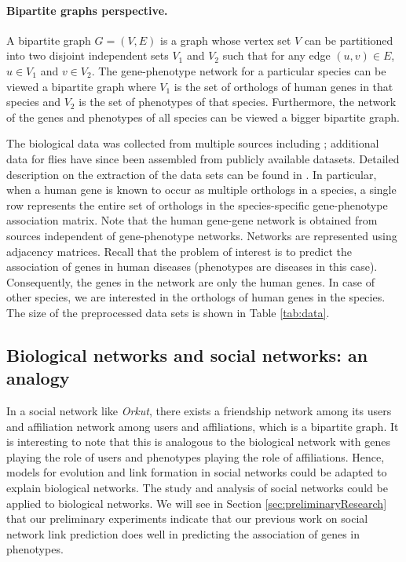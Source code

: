 \paragraph{Bipartite graphs perspective.}
A bipartite graph $G = (V, E)$ is a graph whose vertex set $V$ can be partitioned into two disjoint independent sets $V_{1}$ and $V_{2}$ such that for any edge $(u, v) \in E$, $u \in V_{1}$ and $v \in V_{2}$. The gene-phenotype network for a particular species can be viewed a bipartite graph where $V_{1}$ is the set of orthologs of human genes in that species and $V_{2}$ is the set of phenotypes of that species\cite{pmid19010805, pmid20215462}. Furthermore, the network of the genes and phenotypes of all species can be viewed a bigger bipartite graph. 

The biological data was collected from multiple sources including \cite{pmid18223650, pmid17912365, pmid18613949, pmid20118918}; additional data for flies have since been assembled from publicly available datasets. Detailed description on the extraction of the data sets can be found in \cite{McGarySI}. In particular, when a human gene is known to occur as multiple orthologs in a species, a single row represents the entire set of orthologs in the species-specific gene-phenotype association matrix. Note that the human gene-gene network is obtained from sources independent of gene-phenotype networks\cite{pmid19767740, pmid19728866, pmid19246570}. Networks are represented using adjacency matrices. Recall that the problem of interest is to predict the association of genes in human diseases (phenotypes are diseases in this case). Consequently, the genes in the network are only the human genes. In case of other species, we are interested in the orthologs of human genes in the species. The size of the preprocessed data sets is shown in Table \ref{tab:data}.

\subsection{Biological networks and social networks: an analogy}
In a social network like \emph{Orkut}, there exists a friendship network among its users and affiliation network among users and affiliations, which is a bipartite graph. It is interesting to note that this is analogous to the biological network with genes playing the role of users and phenotypes playing the role of affiliations. Hence, models for evolution and link formation in social networks could be adapted to explain biological networks. The study and analysis of social networks could be applied to biological networks. We will see in Section \ref{sec:preliminaryResearch} that our preliminary experiments indicate that our previous work on social network link prediction does well in predicting the association of genes in phenotypes.

